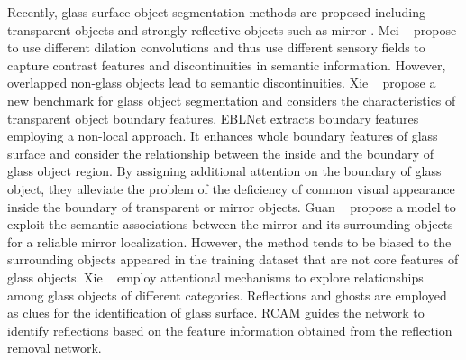 \documentclass[10pt,twocolumn,letterpaper]{article}
\begin{document}
Recently, glass surface object segmentation methods are proposed including transparent objects \cite{xie2020segmenting} \cite{zheng2022glassnet} \cite{he2021enhanced} \cite{he2021enhanced} and strongly reflective objects such as mirror \cite{guan2022learning} \cite{mei2021depth} \cite{yang2019my} \cite{han2023segment}. Mei \etal~\cite{mei2020don} propose to use different dilation convolutions and thus use different sensory fields to capture contrast features and discontinuities in semantic information. However, overlapped non-glass objects lead to semantic discontinuities.
Xie \etal~\cite{xie2020segmenting} propose a new benchmark for glass object segmentation and considers the characteristics of transparent object boundary features. EBLNet \cite{he2021enhanced} extracts boundary features employing a non-local approach. It enhances whole boundary features of glass surface and consider the relationship between the inside and the boundary of glass object region. By assigning additional attention on the boundary of glass object, they alleviate the problem of the deficiency of common visual appearance inside the boundary of transparent or mirror objects. Guan \etal~\cite{guan2022learning} propose a model to exploit the semantic associations between the mirror and its surrounding objects for a reliable mirror localization. However, the method tends to be biased to the surrounding objects appeared in the training dataset that are not core features of glass objects. Xie \etal~\cite{xie2021segmenting} employ attentional mechanisms to explore relationships among glass objects of different categories. Reflections and ghosts are employed as clues for the identification of glass surface. RCAM\cite{lin2021rich} guides the network to identify reflections based on the feature information obtained from the reflection removal network\cite{zhang2018single}. 


\end{document}
